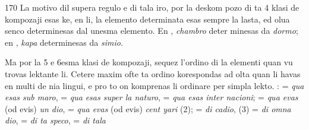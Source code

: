 \begin{VUpage}[174]{170}
La motivo dil supera regulo e di tala iro, por la deskom\cc
pozo di ta 4 klasi de kompozaji esas ke, en li, la elemento\nl
determinata esas sempre la lasta, ed olua senco determinesas\nl
dal unesma elemento. En , \textit{chambro} deter\cc
minesas da \textit{dormo}; en , \textit{kapa} determinesas da\nl
\textit{simio}.

Ma por la 5 e 6esma klasi de kompozaji, sequez l'ordino di\nl
la elementi quan vu trovas lektante li. Cetere maxim ofte ta\nl
ordino korespondas ad olta quan li havas en multi de nia\nl
lingui, e pro to on komprenas li ordinare per simpla lekto.\nl
{} :  = \textit{qua esas sub maro},  = \textit{qua}\nl
\textit{esas super la naturo},  = \textit{qua esas inter nacioni};\nl
{} = \textit{qua evas} (od evis) \textit{un dio},  = \textit{qua evas}\nl
(od evis) \textit{cent yari} (2);  = \textit{di cadio},  (3) =\nl
\textit{di omna dio},  = \textit{di ta speco},  = \textit{di tala}\nl
\end{VUpage}

